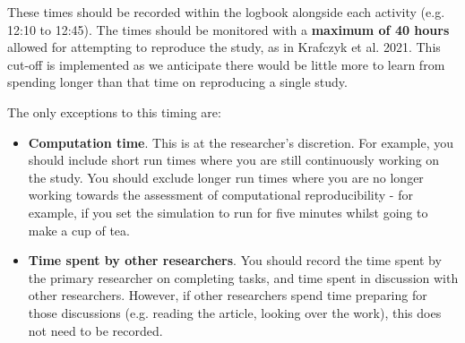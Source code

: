These times should be recorded within the logbook alongside each activity (e.g. 12:10 to 12:45). The times should be monitored with a \textbf{maximum of 40 hours} allowed for attempting to reproduce the study, as in Krafczyk et al. 2021.\autocite{krafczyk_learning_2021} This cut-off is implemented as we anticipate there would be little more to learn from spending longer than that time on reproducing a single study.

The only exceptions to this timing are:
\begin{itemize}
    \item \textbf{Computation time}. This is at the researcher's discretion. For example, you should include short run times where you are still continuously working on the study. You should exclude longer run times where you are no longer working towards the assessment of computational reproducibility - for example, if you set the simulation to run for five minutes whilst going to make a cup of tea.
    \item \textbf{Time spent by other researchers}. You should record the time spent by the primary researcher on completing tasks, and time spent in discussion with other researchers. However, if other researchers spend time preparing for those discussions (e.g. reading the article, looking over the work), this does not need to be recorded.
\end{itemize}